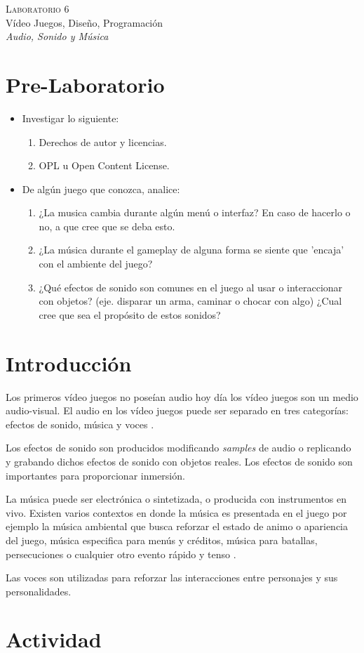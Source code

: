 \begin{center}
\textsc{\Large Laboratorio 6}~\\
{\large Vídeo Juegos, Diseño, Programación}~\\
\emph{Audio, Sonido y Música}
\end{center}

\section{Pre-Laboratorio}
\begin{itemize}
\item Investigar lo siguiente:
\begin{enumerate}
  \item Derechos de autor y licencias.
  \item OPL u Open Content License.
\end{enumerate}
\item De algún juego que conozca, analice:
\begin{enumerate}
  \item ¿La musica cambia durante algún menú o interfaz? En caso de hacerlo o no, a que cree que se deba esto.
  \item ¿La música durante el gameplay de alguna forma se siente que 'encaja' con el ambiente del juego?
  \item ¿Qué efectos de sonido son comunes en el juego al usar o interaccionar con objetos? (eje. disparar un arma, caminar o chocar con algo) ¿Cual cree que sea el propósito de estos sonidos?
\end{enumerate}
\end{itemize}


\section{Introducción}
Los primeros vídeo juegos no poseían audio hoy día los vídeo juegos son un medio audio-visual. El audio en los vídeo juegos puede ser separado en tres categorías: efectos de sonido, música y voces \cite{erikgamedevelopment}\cite{valve_audio}.

Los efectos de sonido son producidos modificando \emph{samples} de audio o replicando y grabando dichos efectos de sonido con objetos reales. Los efectos de sonido son importantes para proporcionar inmersión. 

La música puede ser electrónica o sintetizada, o producida con instrumentos en vivo. Existen varios contextos en donde la música es presentada en el juego por ejemplo la música ambiental que busca reforzar el estado de animo o apariencia del juego, música especifica para menús y créditos, música para batallas, persecuciones o cualquier otro evento rápido y tenso \cite[p.~188]{bobbatesgamedesign}.

Las voces son utilizadas para reforzar las interacciones entre personajes y sus personalidades.

\section{Actividad}
